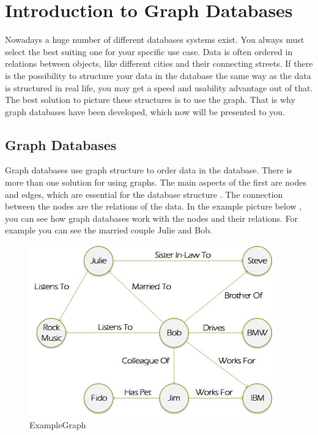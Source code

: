 \section{Introduction to Graph Databases}

Nowadays a huge number of different databases systems exist. You always must select the best suiting one for your specific use case. Data is often ordered in relations between objects, like different cities and their connecting streets. 
If there is the possibility to structure your data in the database the same way as the data is structured in real life, you may get a speed and usability advantage out of that. The best solution to picture these structures is to use the graph. That is why graph databases have been developed, which now will be presented to you.

\subsection{Graph Databases}

Graph databases use graph structure to order data in the database. There is more than one solution for using graphs. The main aspects of the first are nodes and edges, which are essential for the database structure \cite[pp. 1-4]{RobinsonWebberEifrem.2013}.
The connection between the nodes are the relations of the data. In the example picture below \cite[para. 1]{Rouse.2016}, you can see how graph databases work with the nodes and their relations. For example you can see the married couple Julie and Bob.

\begin{figure}[H]
	\includegraphics[width=\linewidth,keepaspectratio]{images/neo4j/IntroExampleGraph.JPG}
	\caption{ExampleGraph}
\end{figure}

